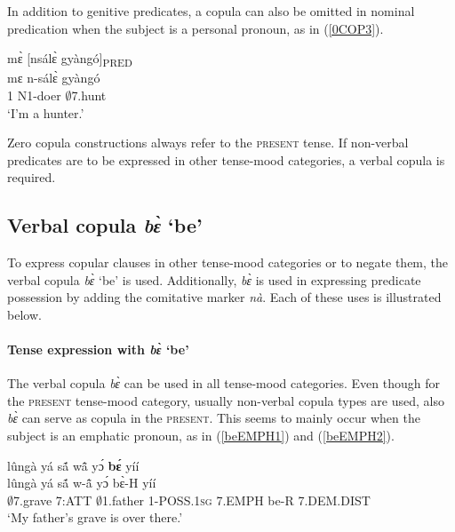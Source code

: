 In addition to genitive predicates, a copula can also be omitted in nominal predication when the subject is a personal pronoun, as in (\ref{0COP3}).


\begin{exe}
\ex\label{0COP3}
  \glll mɛ̀ [nsálɛ̀ gyàngó]\textsubscript{PRED}   \\
        mɛ n-sálɛ̀ gyàngó \\
          1 N1-doer $\emptyset$7.hunt  \\
    \trans `I'm a hunter.'
\end{exe}

\noindent Zero copula constructions always refer to the \textsc{present} tense. If non-verbal predicates are to be expressed in other tense-mood categories, a verbal copula is required. 







\subsection{Verbal copula {\itshape bɛ̀} `be'}
\label{sec:COPbe}

To express copular clauses in other tense-mood categories or to negate them, the verbal copula {\itshape bɛ̀} `be' is used. Additionally, {\itshape bɛ̀} is used in expressing predicate possession by adding the comitative marker {\itshape nà}. Each of these uses is illustrated below.

\paragraph{Tense expression with {\itshape bɛ̀} `be'} The verbal copula {\itshape bɛ̀} can be used in all tense-mood categories. Even though for the \textsc{present} tense-mood category, usually non-verbal copula types are used, also {\itshape bɛ̀} can serve as copula in the \textsc{present}. This seems to mainly occur when the subject is an emphatic pronoun, as in (\ref{beEMPH1}) and (\ref{beEMPH2}). 


\begin{exe} 
\ex\label{beEMPH1} 
  \glll  lûngà yá sã́ wã̂ yɔ́ {\bfseries bɛ́} yíí \\
         lûngà yá sã́ w-ã̂ yɔ́ bɛ̀-H yíí \\
          $\emptyset$7.grave  7:ATT $\emptyset$1.father 1-POSS.1\textsc{sg} 7.EMPH be-R 7.DEM.DIST \\
    \trans `My father's grave is over there.'
\end{exe}


